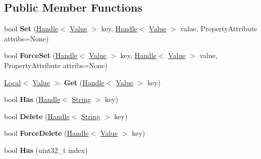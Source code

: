 \subsection*{Public Member Functions}
\begin{DoxyCompactItemize}
\item 
\hypertarget{classv8_1_1_object_a208583edae8e8da2c083879429ee3184}{}bool {\bfseries Set} (\hyperlink{classv8_1_1_handle}{Handle}$<$ \hyperlink{classv8_1_1_value}{Value} $>$ key, \hyperlink{classv8_1_1_handle}{Handle}$<$ \hyperlink{classv8_1_1_value}{Value} $>$ value, Property\+Attribute attribs=None)\label{classv8_1_1_object_a208583edae8e8da2c083879429ee3184}

\item 
\hypertarget{classv8_1_1_object_aa89f3dce24a3a3431295218d24498c52}{}bool {\bfseries Force\+Set} (\hyperlink{classv8_1_1_handle}{Handle}$<$ \hyperlink{classv8_1_1_value}{Value} $>$ key, \hyperlink{classv8_1_1_handle}{Handle}$<$ \hyperlink{classv8_1_1_value}{Value} $>$ value, Property\+Attribute attribs=None)\label{classv8_1_1_object_aa89f3dce24a3a3431295218d24498c52}

\item 
\hypertarget{classv8_1_1_object_a976f0329ff7465c124652d633d469c06}{}\hyperlink{classv8_1_1_local}{Local}$<$ \hyperlink{classv8_1_1_value}{Value} $>$ {\bfseries Get} (\hyperlink{classv8_1_1_handle}{Handle}$<$ \hyperlink{classv8_1_1_value}{Value} $>$ key)\label{classv8_1_1_object_a976f0329ff7465c124652d633d469c06}

\item 
\hypertarget{classv8_1_1_object_a5ae86b3538e5afbca528a0e3bdd896cc}{}bool {\bfseries Has} (\hyperlink{classv8_1_1_handle}{Handle}$<$ \hyperlink{classv8_1_1_string}{String} $>$ key)\label{classv8_1_1_object_a5ae86b3538e5afbca528a0e3bdd896cc}

\item 
\hypertarget{classv8_1_1_object_a51d85c48448af7812f60c1ca75111dd8}{}bool {\bfseries Delete} (\hyperlink{classv8_1_1_handle}{Handle}$<$ \hyperlink{classv8_1_1_string}{String} $>$ key)\label{classv8_1_1_object_a51d85c48448af7812f60c1ca75111dd8}

\item 
\hypertarget{classv8_1_1_object_a8e7f3b8b70eb17bcb5cc087d5b6746d6}{}bool {\bfseries Force\+Delete} (\hyperlink{classv8_1_1_handle}{Handle}$<$ \hyperlink{classv8_1_1_value}{Value} $>$ key)\label{classv8_1_1_object_a8e7f3b8b70eb17bcb5cc087d5b6746d6}

\item 
\hypertarget{classv8_1_1_object_ac547af2f2d256d96991ff20159a44bfd}{}bool {\bfseries Has} (uint32\+\_\+t index)\label{classv8_1_1_object_ac547af2f2d256d96991ff20159a44bfd}


\end{DoxyCompactItemize}
